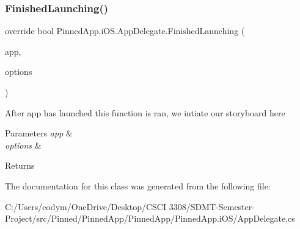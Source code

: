 \subsubsection{\texorpdfstring{Finished\+Launching()}{FinishedLaunching()}}
{\footnotesize\ttfamily override bool Pinned\+App.\+i\+O\+S.\+App\+Delegate.\+Finished\+Launching (\begin{DoxyParamCaption}\item[{U\+I\+Application}]{app,  }\item[{N\+S\+Dictionary}]{options }\end{DoxyParamCaption})}



After app has launched this function is ran, we intiate our storyboard here 


\begin{DoxyParams}{Parameters}
{\em app} & \\
\hline
{\em options} & \\
\hline
\end{DoxyParams}
\begin{DoxyReturn}{Returns}

\end{DoxyReturn}


The documentation for this class was generated from the following file\+:\begin{DoxyCompactItemize}
\item 
C\+:/\+Users/codym/\+One\+Drive/\+Desktop/\+C\+S\+C\+I 3308/\+S\+D\+M\+T-\/\+Semester-\/\+Project/src/\+Pinned/\+Pinned\+App/\+Pinned\+App/\+Pinned\+App.\+i\+O\+S/App\+Delegate.\+cs\end{DoxyCompactItemize}
